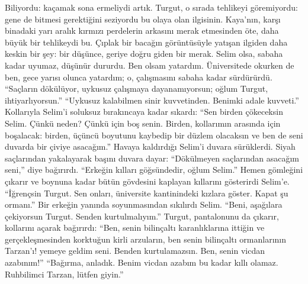 \documentclass[a5paper,13pt]{scrbook}
\begin{document}
Biliyordu: kaçamak sona ermeliydi artık. Turgut, o sırada tehlikeyi göremiyordu:
gene de bitmesi gerektiğini seziyordu bu olaya olan ilgisinin. Kaya'nın, karşı
binadaki yarı aralık kırmızı perdelerin arkasını merak etmesinden öte, daha
büyük bir tehlikeydi bu. Çıplak bir bacağın görüntüsüyle yatışan ilgiden daha
keskin bir şey: bir düşünce, geriye doğru giden bir merak. Selim olsa, sabaha
kadar uyumaz, düşünür dururdu. Ben olsam yatardım. Üniversitede okurken de ben,
gece yarısı olunca yatardım; o, çalışmasını sabaha kadar sürdürürdü. ``Saçların
dökülüyor, uykusuz çalışmaya dayanamıyorsun; oğlum Turgut, ihtiyarlıyorsun.''
``Uykusuz kalabilmen sinir kuvvetinden. Benimki adale kuvveti.'' Kollarıyla
Selim'i soluksuz bırakıncaya kadar sıkardı: ``Sen birden çökeceksin Selim. Çünkü
neden? Çünkü için boş senin. Birden, kollarımın arasında için boşalacak: birden,
üçüncü boyutunu kaybedip bir düzlem olacaksın ve ben de seni duvarda bir çiviye
asacağım.'' Havaya kaldırdığı Selim'i duvara sürüklerdi. Siyah saçlarından
yakalayarak başını duvara dayar: ``Dökülmeyen saçlarından asacağım seni,'' diye
bağırırdı. ``Erkeğin kılları göğsündedir, oğlum Selim.'' Hemen gömleğini çıkarır
ve boynuna kadar bütün gövdesini kaplayan kıllarını gösterirdi Selim'e.
``İğrençsin Turgut. Sen onları, üniversite kantinindeki kızlara göster. Kapat şu
ormanı.'' Bir erkeğin yanında soyunmasından sıkılırdı Selim. ``Beni, aşağılara
çekiyorsun Turgut. Senden kurtulmalıyım.'' Turgut, pantalonunu da çıkarır,
kollarını açarak bağırırdı: ``Ben, senin bilinçaltı karanlıklarına ittiğin ve
gerçekleşmesinden korktuğun kirli arzuların, ben senin bilinçaltı ormanlarının
Tarzan'ı! yemeye geldim seni. Benden kurtulamazsın. Ben, senin vicdan azabınım!''
``Bağırma, anladık. Benim vicdan azabım bu kadar kıllı olamaz. Ruhbilimci Tarzan,
lütfen giyin.''
\end{document}
